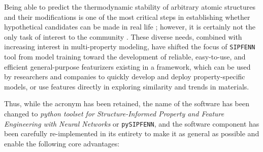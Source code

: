 Being able to predict the thermodynamic stability of arbitrary atomic structures and their modifications is one of the most critical steps in establishing whether hypothetical candidates can be made in real life \cite{Zunger2019BewareMaterials}; however, it is certainly not the only task of interest to the community \cite{Jha2023MachineChallenges, Tao2021MachineDiscovery}. These diverse needs, combined with increasing interest in multi-property modeling, have shifted the focus of \texttt{SIPFENN} tool from model training \cite{Krajewski2022ExtensibleNetworks} toward the development of reliable, easy-to-use, and efficient general-purpose featurizers existing in a framework, which can be used by researchers and companies to quickly develop and deploy property-specific models, or use features directly in exploring similarity and trends in materials.

Thus, while the acronym has been retained, the name of the software has been changed to \textit{python toolset for Structure-Informed Property and Feature Engineering with Neural Networks} or \texttt{pySIPFENN}, and the software component has been carefully re-implemented in its entirety to make it as general as possible and enable the following core advantages:

